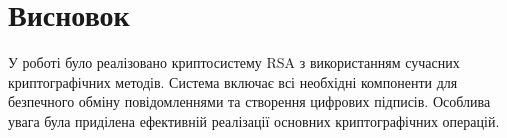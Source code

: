 \documentclass{article}
\begin{document}
\section{Висновок}
\quad
У роботі було реалізовано криптосистему RSA з використанням сучасних криптографічних методів. Система включає всі необхідні компоненти для безпечного обміну повідомленнями та створення цифрових підписів. Особлива увага була приділена ефективній реалізації основних криптографічних операцій.
\end{document}

